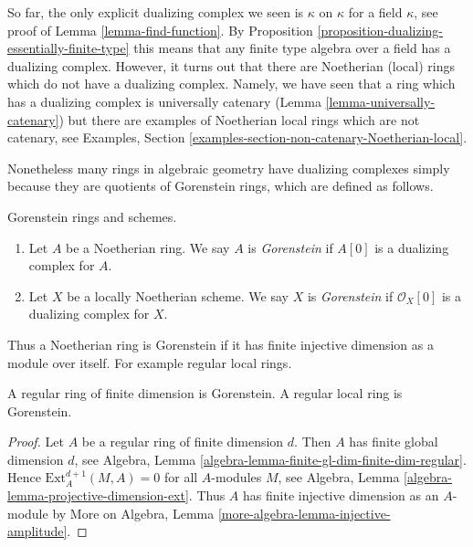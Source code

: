 \noindent
So far, the only explicit dualizing complex we seen is $\kappa$ on $\kappa$
for a field $\kappa$, see proof of Lemma \ref{lemma-find-function}.
By Proposition \ref{proposition-dualizing-essentially-finite-type}
this means that any finite type algebra over a field has a dualizing
complex. However, it turns out that there are Noetherian (local) rings
which do not have a dualizing complex. Namely, we have seen that
a ring which has a dualizing complex is universally catenary
(Lemma \ref{lemma-universally-catenary}) but there are examples of
Noetherian local rings which are not catenary, see
Examples, Section \ref{examples-section-non-catenary-Noetherian-local}.

\medskip\noindent
Nonetheless many rings in algebraic geometry have dualizing complexes
simply because they are quotients of Gorenstein rings, which are defined
as follows.

\begin{definition}
\label{definition-gorenstein}
Gorenstein rings and schemes.
\begin{enumerate}
\item Let $A$ be a Noetherian ring. We say $A$ is {\it Gorenstein}
if $A[0]$ is a dualizing complex for $A$.
\item Let $X$ be a locally Noetherian scheme. We say $X$ is {\it Gorenstein}
if $\mathcal{O}_X[0]$ is a dualizing complex for $X$.
\end{enumerate}
\end{definition}

\noindent
Thus a Noetherian ring is Gorenstein if it has finite injective dimension
as a module over itself. For example regular local rings.

\begin{lemma}
\label{lemma-regular-gorenstein}
A regular ring of finite dimension is Gorenstein.
A regular local ring is Gorenstein.
\end{lemma}

\begin{proof}
Let $A$ be a regular ring of finite dimension $d$. Then $A$ has finite
global dimension $d$, see
Algebra, Lemma \ref{algebra-lemma-finite-gl-dim-finite-dim-regular}.
Hence $\text{Ext}^{d + 1}_A(M, A) = 0$ for all $A$-modules $M$, see
Algebra, Lemma \ref{algebra-lemma-projective-dimension-ext}.
Thus $A$ has finite injective dimension as an $A$-module by
More on Algebra, Lemma \ref{more-algebra-lemma-injective-amplitude}.
\end{proof}





